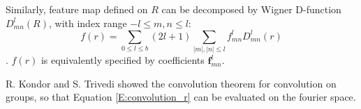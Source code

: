 \documentclass{IEEEtran}
\begin{document}
Similarly, feature map defined on $R$ can be decomposed by Wigner D-function $D_{mn}^l(R)$,
with index range $-l \leq m,n \leq l$:
\begin{equation}
    f(r) = \sum_{0\leq l \leq b} (2l+1) \sum_{|m|,|n|\leq l} f_{mn}^l D_{mn}^l(r)
    \label{E:so3_fft}
\end{equation}.
$f(r)$ is equivalently specified by coefficients $\mathbf{f}_{mn}^l$.

R. Kondor and S. Trivedi showed the convolution theorem for convolution on groups, so that Equation \eqref{E:convolution_r} can be 
evaluated on the fourier space.

\end{document}
